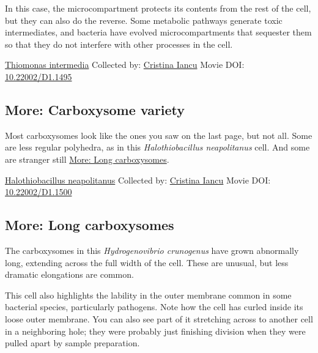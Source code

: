 \documentclass[]{tufte-book}
\begin{document}
In this case, the microcompartment protects its contents from the rest of the cell, but they can also do the reverse. Some metabolic pathways generate toxic intermediates, and bacteria have evolved microcompartments that sequester them so that they do not interfere with other processes in the cell.



\hypertarget{htmlwidget-6b68b82149239e32c63a}{}

\label{fig:4-7}\protect\hyperlink{tree}{Thiomonas intermedia} Collected by: \protect\hyperlink{cristina_iancu}{Cristina Iancu} Movie DOI: \href{https://doi.org/10.22002/D1.1495}{10.22002/D1.1495}

\hypertarget{Carboxysome_variety}{%
\subsection*{More: Carboxysome variety}\label{Carboxysome_variety}}

Most carboxysomes look like the ones you saw on the last page, but not all. Some are less regular polyhedra, as in this \emph{Halothiobacillus neapolitanus} cell. And some are stranger still \protect\hyperlink{Long_carboxysomes}{More: Long carboxysomes}.



\hypertarget{htmlwidget-cc13d9698a0b57411530}{}

\label{fig:4-7a}\protect\hyperlink{tree}{Halothiobacillus neapolitanus} Collected by: \protect\hyperlink{cristina_iancu}{Cristina Iancu} Movie DOI: \href{https://doi.org/10.22002/D1.1500}{10.22002/D1.1500}

\hypertarget{Long_carboxysomes}{%
\subsection*{More: Long carboxysomes}\label{Long_carboxysomes}}

The carboxysomes in this \emph{Hydrogenovibrio crunogenus} have grown abnormally long, extending across the full width of the cell. These are unusual, but less dramatic elongations are common.

This cell also highlights the lability in the outer membrane common in some bacterial species, particularly pathogens. Note how the cell has curled inside its loose outer membrane. You can also see part of it stretching across to another cell in a neighboring hole; they were probably just finishing division when they were pulled apart by sample preparation.
\end{document}
